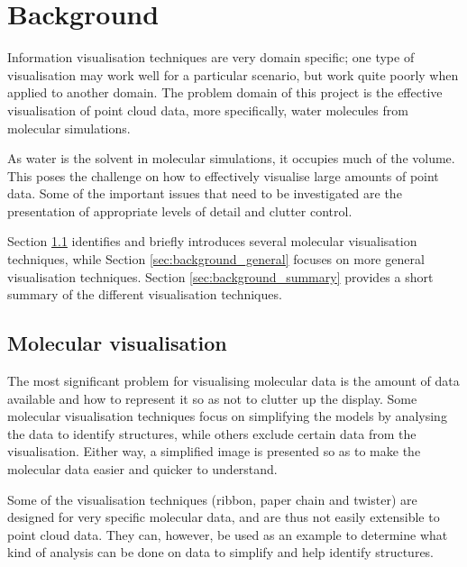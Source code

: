 \graphicspath{{./background/}}

\chapter{Background}
\label{cha:background}


Information visualisation techniques are very domain specific; one type of
visualisation may work well for a particular scenario, but work quite poorly
when applied to another domain. The problem domain of this project is the
effective visualisation of point cloud data, more specifically, water molecules
from molecular simulations.

As water is the solvent in molecular simulations, it occupies much of the
volume. This poses the challenge on how to effectively visualise large amounts
of point data. Some of the important issues that need to be investigated are
the presentation of appropriate levels of detail and clutter control.

Section \ref{sec:background_molecular} identifies and briefly introduces
several molecular visualisation techniques, while Section
\ref{sec:background_general} focuses on more general visualisation techniques.
Section \ref{sec:background_summary} provides a short summary of the different
visualisation techniques.


\section{Molecular visualisation}
\label{sec:background_molecular}


The most significant problem for visualising molecular data is the amount of
data available and how to represent it so as not to clutter up the display.
Some molecular visualisation techniques focus on simplifying the models by
analysing the data to identify structures, while others exclude certain data
from the visualisation. Either way, a simplified image is presented so as to
make the molecular data easier and quicker to understand.

Some of the visualisation techniques (ribbon, paper chain and twister) are
designed for very specific molecular data, and are thus not easily extensible
to point cloud data. They can, however, be used as an example to determine what
kind of analysis can be done on data to simplify and help identify structures.

